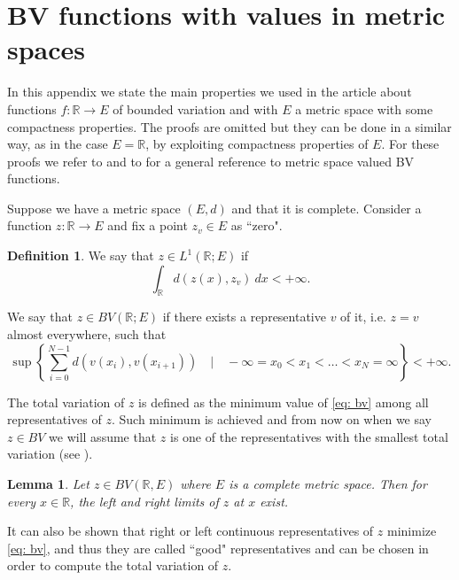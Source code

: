 \documentclass[12pt]{article}
\newcommand{\R}{\mathbb{R}}
\newcommand{\1}{\mathds{1}}
\newtheorem{lem}[teo]{Lemma}
\theoremstyle{definition}
\newtheorem{defi}[teo]{Definition}
\begin{document}
\appendix
\section{BV functions with values in metric spaces}\label{A1}

In this appendix we state the main properties we used in the article about functions $f: \R \to E$ of bounded variation and with $E$ a metric space with some compactness properties. The proofs are omitted but they can be done in a similar way, as in the case $E=\R$, by exploiting compactness properties of $E.$ For these proofs we refer to \cite[Chapter~3]{AB3} and to \cite{AFP} for a general reference to metric space valued BV functions.\par 
Suppose we have a metric space $(E,d)$ and that it is complete. Consider a function $z: \R \to E$ and fix a point $z_v \in E$ as ``zero".

\begin{defi}\label{def: zL1BV}
    We say that $z\in L^1(\R;E)$ if \begin{equation}
        \int_{\R} d(z(x),z_v)~dx < +\infty.
    \end{equation}\par
    We say that $z\in BV(\R;E)$ if there exists a representative $v$ of it, i.e. $z=v$ almost everywhere, such that \begin{equation}\label{eq: bv}
    \sup\left\{ \sum_{i=0}^{N-1} d(v(x_i),v(x_{i+1})) \quad \bigg| \quad -\infty=x_0<x_1<\dots<x_N=\infty\right\} < +\infty.
    \end{equation}
\end{defi}
The total variation of $z$ is defined as the minimum value of \eqref{eq: bv} among all representatives of $z$. Such minimum is achieved and from now on when we say $z\in BV$ we will assume that $z$ is one of the representatives with the smallest total variation (see \cite{AFP}).

\begin{lem}\label{lemma: BV1}
    Let $z\in BV(\R,E)$ where $E$ is a complete metric space. Then for every $x\in \R$, the left and right limits of $z$ at $x$ exist.
\end{lem}

It can also be shown that right or left continuous representatives of $z$ minimize \eqref{eq: bv}, and thus they are called ``good" representatives and can be chosen in order to compute the total variation of $z$.
\end{document}

